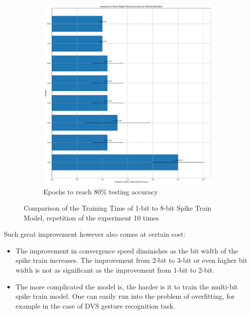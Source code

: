 \begin{figure}[!htpb]
\begin{subfigure}[H]{0.47\textwidth}
                \includegraphics[width=\textwidth]{../standard/FashionMNIST/plots/fashionmnist_test_iters.pdf}
                \caption{Epochs to reach 80\% testing accuracy}
            \end{subfigure}
            \caption{Comparison of the Training Time of 1-bit to 8-bit Spike Train Model, repetition of the experiment 10 times}
            \label{fig:iterations_fixed_accuracy}
        \end{figure}

        Such great improvement however also comes at certain cost:
        \begin{itemize}
            \item The improvement in convergence speed diminishes as the bit width of the spike train increases. The improvement from 2-bit to 3-bit or even higher bit width is not as significant as the improvement from 1-bit to 2-bit.
            \item The more complicated the model is, the harder is it to train the multi-bit spike train model. One can easily run into the problem of overfitting, for example in the case of DVS gesture recognition task.
        \end{itemize}

